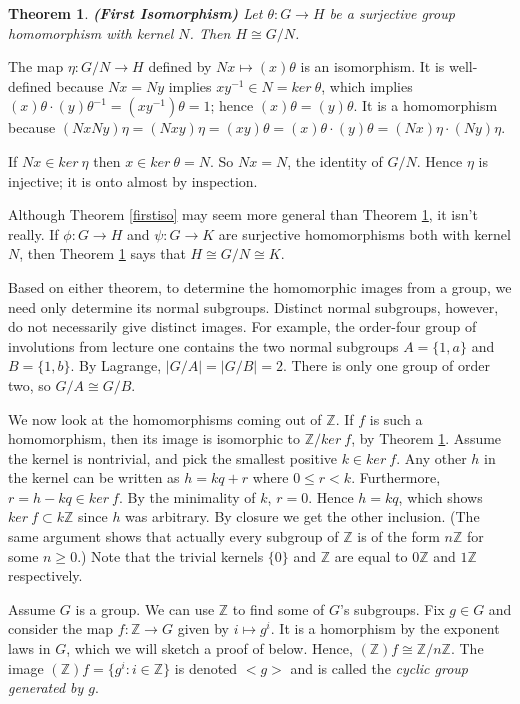 \documentclass[letterpaper]{article}
\newtheorem{theorem}{Theorem}[section]
\newcommand{\mdot}{{\cdot}}
\newenvironment{proof}[1][Proof]{\begin{trivlist}
\item[\hskip \labelsep {\bfseries #1}]}{\end{trivlist}}
\begin{document}
\begin{theorem}
\label{iso1}
\emph{\textbf{(First Isomorphism)}}
Let $\theta \colon G \rightarrow H$ be a surjective group homomorphism with kernel $N$.  Then $H \cong G/N$.
\end{theorem}
\begin{proof}
The map $\eta \colon G/N \rightarrow H$ defined by $Nx \mapsto (x)\theta$ is an isomorphism. It is well-defined because $Nx = Ny$ implies $xy^{-1} \in N = ker\ \theta$, which implies $(x)\theta\mdot(y)\theta^{-1} = (xy^{-1})\theta = 1$; hence $(x)\theta = (y)\theta$. It is a homomorphism because $(NxNy)\eta = (Nxy)\eta = (xy)\theta = (x)\theta\mdot(y)\theta = (Nx)\eta\mdot(Ny)\eta$.

If $Nx \in ker\ \eta$ then $x \in ker\ \theta = N$. So $Nx = N$, the identity of $G/N$. Hence $\eta$ is injective; it is onto almost by inspection.
\end{proof}

Although Theorem \ref{firstiso} may seem more general than Theorem \ref{iso1}, it isn't really. If $\phi \colon G \rightarrow H$ and $\psi \colon G \rightarrow K$ are surjective homomorphisms both with kernel $N$, then Theorem \ref{iso1} says that $H \cong G/N \cong K$.

Based on either theorem, to determine the homomorphic images from a group, we need only determine its normal subgroups. Distinct normal subgroups, however, do not necessarily give distinct images. For example, the order-four group of involutions from lecture one contains the two normal subgroups $A = \{1, a\}$ and $B = \{1, b\}$. By Lagrange, $|G/A| = |G/B| = 2$. There is only one group of order two, so $G/A \cong G/B$.

We now look at the homomorphisms coming out of $\mathbb{Z}$. If $f$ is such a homomorphism, then its image is isomorphic to $\mathbb{Z}/ker\ f$, by Theorem \ref{iso1}. Assume the kernel is nontrivial, and pick the smallest positive $k \in ker\ f$. Any other $h$ in the kernel can be written as $h = kq + r$ where $0 \le r < k$. Furthermore, $r = h - kq \in ker\ f$. By the minimality of $k$, $r = 0$. Hence $h = kq$, which shows $ker\ f \subset k\mathbb{Z}$ since $h$ was arbitrary. By closure we get the other inclusion. (The same argument shows that actually every subgroup of $\mathbb{Z}$ is of the form $n\mathbb{Z}$ for some $n \ge 0$.) Note that the trivial kernels $\{0\}$ and $\mathbb{Z}$ are equal to $0\mathbb{Z}$ and $1\mathbb{Z}$ respectively.

Assume $G$ is a group. We can use $\mathbb{Z}$ to find some of $G$'s subgroups. Fix $g \in G$ and consider the map $f \colon \mathbb{Z} \rightarrow G$ given by $i \mapsto g^{i}$. It is a homorphism by the exponent laws in $G$, which we will sketch a proof of below. Hence, $(\mathbb{Z})f \cong \mathbb{Z}/n\mathbb{Z}$. The image $(\mathbb{Z})f = \{g^i \colon i \in \mathbb{Z}\}$ is denoted ${<}g{>}$ and is called the \emph{cyclic group generated by $g$}.
\end{document}
